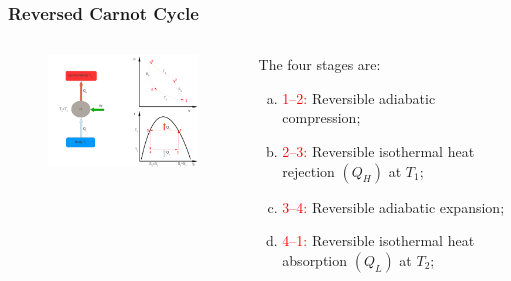 \documentclass[10pt,compress]{beamer}
\begin{document}
\begin{frame}
 \frametitle{Reversed Carnot Cycle}
  \begin{columns}

   \begin{column}[c]{0.55\linewidth}
    \begin{figure}%
     \begin{center}
      \includegraphics[width=6.8cm,height=6.cm]{./Pics/Overview_Refrig4}
     \end{center}
    \end{figure}  
   \end{column}  


   \begin{column}[c]{0.45\linewidth}
    The four stages are:
    \begin{enumerate}[(a)]
     \item <1-> \textcolor{red}{1--2:} Reversible adiabatic compression;
     \item <2-> \textcolor{red}{2--3:} Reversible isothermal heat rejection $\left(Q_{H}\right)$ at $T_{1}$;
     \item <3-> \textcolor{red}{3--4:} Reversible adiabatic expansion;
     \item <4-> \textcolor{red}{4--1:} Reversible isothermal heat absorption $\left(Q_{L}\right)$ at $T_{2}$;
    \end{enumerate}
   \end{column}
  \end{columns}
\end{frame}
\end{document}
